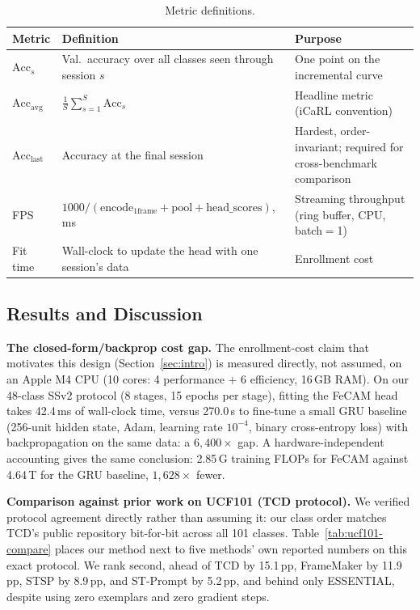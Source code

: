 \documentclass[11pt]{article}
\begin{document}
\begin{table}[h]
\centering
\caption{Metric definitions.}
\label{tab:metrics}
\small
\begin{tabular}{@{}lL{6.3cm}L{5.7cm}@{}}
\toprule
Metric & Definition & Purpose \\
\midrule
$\mathrm{Acc}_s$ & Val.\ accuracy over all classes seen through session $s$ & One point on the incremental curve \\
$\mathrm{Acc}_{\mathrm{avg}}$ & $\frac{1}{S}\sum_{s=1}^{S}\mathrm{Acc}_s$ & Headline metric (iCaRL convention) \\
$\mathrm{Acc}_{\mathrm{last}}$ & Accuracy at the final session & Hardest, order-invariant; required for cross-benchmark comparison \\
\midrule
FPS & $1000 / (\text{encode}_{\text{1frame}} + \text{pool} + \text{head\_scores})$, ms & Streaming throughput (ring buffer, CPU, batch$=$1) \\
Fit time & Wall-clock to update the head with one session's data & Enrollment cost \\
\bottomrule
\end{tabular}
\end{table}

\subsection{Results and Discussion}

\textbf{The closed-form/backprop cost gap.} The enrollment-cost claim that
motivates this design (Section~\ref{sec:intro}) is measured directly, not
assumed, on an Apple M4 CPU (10 cores: 4 performance $+$ 6 efficiency,
16\,GB RAM). On our 48-class SSv2 protocol (8 stages, 15 epochs per
stage), fitting the FeCAM head takes 42.4\,ms of wall-clock time, versus
270.0\,s to fine-tune a small GRU baseline (256-unit hidden state, Adam,
learning rate $10^{-4}$, binary cross-entropy loss) with backpropagation
on the same data: a $6{,}400\times$ gap. A hardware-independent accounting
gives the same conclusion: 2.85\,G training FLOPs for FeCAM against
4.64\,T for the GRU baseline, $1{,}628\times$ fewer.

\textbf{Comparison against prior work on UCF101 (TCD protocol).} We verified
protocol agreement directly rather than assuming it: our class order matches
TCD's public repository bit-for-bit across all 101 classes.
Table~\ref{tab:ucf101-compare} places our method next to five methods' own
reported numbers on this exact protocol. We rank second, ahead of TCD by
15.1\,pp, FrameMaker by 11.9\,pp, STSP by 8.9\,pp, and ST-Prompt by
5.2\,pp, and behind only ESSENTIAL, despite using zero exemplars and zero
gradient steps.
\end{document}
